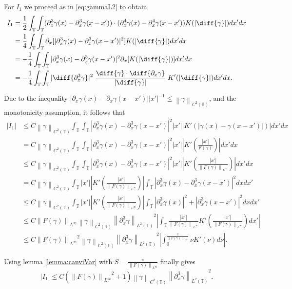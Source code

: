 \documentclass[a4paper]{amsart}
\theoremstyle{definition}
\newcommand{\T}{\ensuremath{\mathbb{T}}}
\newcommand{\Np}[2][\infty]{\ensuremath{\left\|#2\right\|_{L^#1}}}
\newcommand{\Lp}[2][2]{\ensuremath{\left\|#2\right\|_{L^#1(\T)}}}
\newcommand{\Ck}[2][2]{\ensuremath{\left\|#2\right\|_{C^#1(\T)}}}
\begin{document}
For $I_1$ we proceed as in \eqref{eq:gammaL2} to obtain
\begin{align*}
    I_1&=\frac{1}{2}\int_\T\int_\T (\partial_x^3\gamma(x)-\partial_ x^3\gamma(x-x')) \cdot (\partial_x^4\gamma(x)-\partial_x^4\gamma(x-x'))K(|\diff{\gamma}|)dx'dx\\
    &=\frac{1}{4}\int_\T\int_\T \partial_x[|\partial_x^3\gamma(x)-\partial_x^3\gamma(x-x')|^2]K(|\diff{\gamma}|)dx'dx\\
    &=-\frac{1}{4} \int_\T\int_\T |\partial_x^3\gamma(x)-\partial_x^3\gamma(x-x')|^2 \partial_x[K(|\diff{\gamma}|)]dx'dx\\
    &= -\frac{1}{4} \int_\T\int_\T |\diff{\partial_x^3\gamma}|^2\; \frac{\diff{\gamma}\cdot \diff{\partial_x\gamma}}{|\diff{\gamma}|}\;  K'(|\diff{\gamma}|) dx' dx.
\end{align*}

Due to the inequality $|\partial_x\gamma(x)-\partial_x\gamma(x-x')||x'|^{-1}\leq \Ck{\gamma}$, and the monotonicity assumption, it follows that 
\begin{align*}
    |I_1|&\leq C \Ck{\gamma}  \int_\T\int_\T |\partial_x^3\gamma(x)-\partial_x^3\gamma(x-x')|^2 |x'| |K'(|\gamma(x)-\gamma(x-x')|)| dx'dx \\
    &= C \Ck{\gamma} \int_\T\int_\T |\partial_x^3\gamma(x)-\partial_x^3\gamma(x-x')|^2 |x'| \left|K'\left(\frac{|x'|}{F(\gamma)}\right)\right|dx'dx\\
    &\leq C \Ck{\gamma} \int_\T\int_\T |\partial_x^3\gamma(x)-\partial_x^3\gamma(x-x')|^2 |x'| \left|K'\left(\frac{|x'|}{\Np{F(\gamma)}}\right)\right|dx'dx\\
    &= C \Ck{\gamma} \int_\T |x'| \left|K'\left(\frac{|x'|}{\Np{F(\gamma)}}\right)\right| \int_\T |\partial_x^3\gamma(x)-\partial_x^3\gamma(x-x')|^2 dxdx'\\
    &\leq  C \Ck{\gamma} \int_\T |x'| \left|K'\left(\frac{|x'|}{\Np{F(\gamma)}}\right)\right| \int_\T |\partial_x^3\gamma(x)|^2+|\partial_x^3\gamma(x-x')|^2 dxdx'\\
    &\leq  C \Np{F(\gamma)} \Ck{\gamma} \Lp{\partial_x^3\gamma}^2 \left|\int_\T \frac{|x'|}{\Np{F(\gamma)}} K'\left(\frac{|x'|}{\Np{F(\gamma)}}\right)dx' \right|\\
    &\leq C \Np{F(\gamma)}^2 \Ck{\gamma} \Lp{\partial_x^3\gamma}^2 \left|\int_0^{\frac{\pi}{\Np{F(\gamma)}}} \nu K'\left(\nu\right)d\nu \right|.
\end{align*}


Using lemma \ref{lemma:canviVar} with $S=\frac{\pi}{\Np{F(\gamma)}}$  finally gives $$|I_1|\leq  C (\Np{F(\gamma)}^2 + 1 )\Ck{\gamma} \Lp{\partial_x^3\gamma}^2. $$
\end{document}
